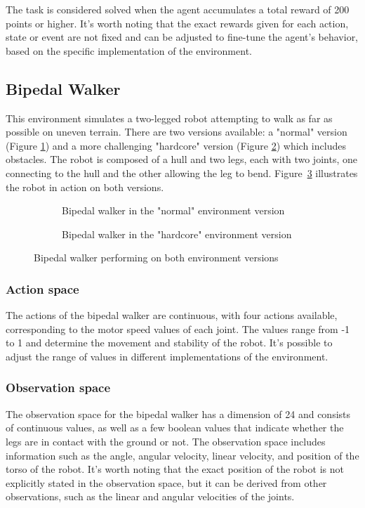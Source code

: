 The task is considered solved when the agent accumulates a total reward of 200 points or higher. It's worth noting that the exact rewards given for each action, state or event are not fixed and can be adjusted to fine-tune the agent's behavior, based on the specific implementation of the environment.

\subsection{Bipedal Walker}
This environment simulates a two-legged robot attempting to walk as far as possible on uneven terrain. There are two versions available: a "normal" version (Figure \ref{bipedal_normal}) and a more challenging "hardcore" version (Figure \ref{bipedal_hardcore}) which includes obstacles. The robot is composed of a hull and two legs, each with two joints, one connecting to the hull and the other allowing the leg to bend. Figure~\ref{fig:bipedal_walker} illustrates the robot in action on both versions.

\begin{figure}[!ht]
    \centering
    \begin{subfigure}{.48\textwidth}
        \centering
        \caption{Bipedal walker in the "normal" environment version} 
        \label{bipedal_normal}
    \end{subfigure}%
    \hspace{1em}
    \begin{subfigure}{.48\textwidth}
        \centering
        \caption{Bipedal walker in the "hardcore" environment version} 
        \label{bipedal_hardcore}
    \end{subfigure}
    \caption{Bipedal walker performing on both environment versions}
    \label{fig:bipedal_walker}
\end{figure}

\subsubsection{Action space}
The actions of the bipedal walker are continuous, with four actions available, corresponding to the motor speed values of each joint. The values range from -1 to 1 and determine the movement and stability of the robot. It's possible to adjust the range of values in different implementations of the environment.

\subsubsection{Observation space}
The observation space for the bipedal walker has a dimension of 24 and consists of continuous values, as well as a few boolean values that indicate whether the legs are in contact with the ground or not. The observation space includes information such as the angle, angular velocity, linear velocity, and position of the torso of the robot. It's worth noting that the exact position of the robot is not explicitly stated in the observation space, but it can be derived from other observations, such as the linear and angular velocities of the joints.

